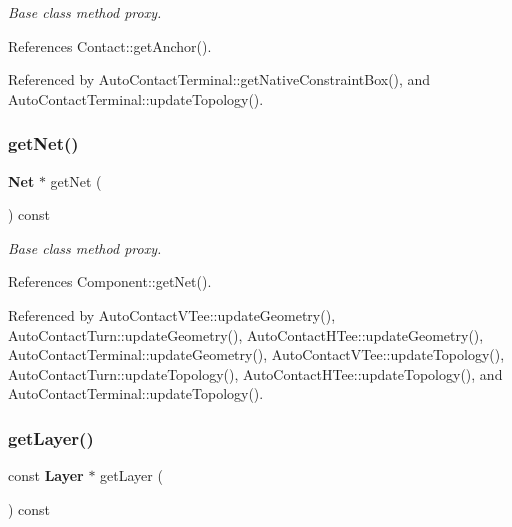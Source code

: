 {\itshape Base class method proxy.} 

References Contact\+::get\+Anchor().



Referenced by Auto\+Contact\+Terminal\+::get\+Native\+Constraint\+Box(), and Auto\+Contact\+Terminal\+::update\+Topology().

\mbox{\label{classKatabatic_1_1AutoContact_a692492374623a5c6096b2c4a51190359}} 
\subsubsection{\texorpdfstring{get\+Net()}{getNet()}}
{\footnotesize\ttfamily \textbf{ Net} $\ast$ get\+Net (\begin{DoxyParamCaption}{ }\end{DoxyParamCaption}) const\hspace{0.3cm}{\ttfamily [inline]}}

{\itshape Base class method proxy.} 

References Component\+::get\+Net().



Referenced by Auto\+Contact\+V\+Tee\+::update\+Geometry(), Auto\+Contact\+Turn\+::update\+Geometry(), Auto\+Contact\+H\+Tee\+::update\+Geometry(), Auto\+Contact\+Terminal\+::update\+Geometry(), Auto\+Contact\+V\+Tee\+::update\+Topology(), Auto\+Contact\+Turn\+::update\+Topology(), Auto\+Contact\+H\+Tee\+::update\+Topology(), and Auto\+Contact\+Terminal\+::update\+Topology().

\mbox{\label{classKatabatic_1_1AutoContact_ab045567c4f529dca7790d66c17c3084f}} 
\subsubsection{\texorpdfstring{get\+Layer()}{getLayer()}}
{\footnotesize\ttfamily const \textbf{ Layer} $\ast$ get\+Layer (\begin{DoxyParamCaption}{ }\end{DoxyParamCaption}) const\hspace{0.3cm}{\ttfamily [inline]}}

